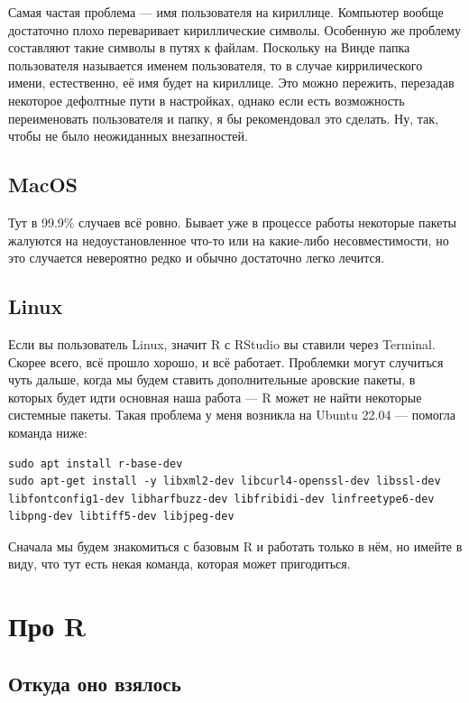 \documentclass[
  letterpaper,
  DIV=11,
  numbers=noendperiod]{scrreprt}
\theoremstyle{definition}
\theoremstyle{remark}
\begin{document}
Самая частая проблема --- имя пользователя на кириллице. Компьютер
вообще достаточно плохо переваривает кириллические символы. Особенную же
проблему составляют такие символы в путях к файлам. Поскольку на Винде
папка пользователя называется именем пользователя, то в случае
киррилического имени, естественно, её имя будет на кириллице. Это можно
пережить, перезадав некоторое дефолтные пути в настройках, однако если
есть возможность переименовать пользователя и папку, я бы рекомендовал
это сделать. Ну, так, чтобы не было неожиданных внезапностей.

\subsection{MacOS}\label{rbasics-installation-problems-mac}

Тут в 99.9\% случаев всё ровно. Бывает уже в процессе работы некоторые
пакеты жалуются на недоустановленное что-то или на какие-либо
несовместимости, но это случается невероятно редко и обычно достаточно
легко лечится.

\subsection{Linux}\label{rbasics-installation-problems-linux}

Если вы пользователь Linux, значит R с RStudio вы ставили через
Terminal. Скорее всего, всё прошло хорошо, и всё работает. Проблемки
могут случиться чуть дальше, когда мы будем ставить дополнительные
аровские пакеты, в которых будет идти основная наша работа --- R может
не найти некоторые системные пакеты. Такая проблема у меня возникла на
Ubuntu 22.04 --- помогла команда ниже:

\begin{verbatim}
sudo apt install r-base-dev
sudo apt-get install -y libxml2-dev libcurl4-openssl-dev libssl-dev libfontconfig1-dev libharfbuzz-dev libfribidi-dev linfreetype6-dev libpng-dev libtiff5-dev libjpeg-dev
\end{verbatim}

Сначала мы будем знакомиться с базовым R и работать только в нём, но
имейте в виду, что тут есть некая команда, которая может пригодиться.

\section{Про R}\label{rbasics-r-about}

\subsection{Откуда оно взялось}\label{rbasics-where-r-from}
\end{document}
